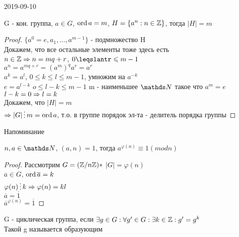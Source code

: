 \documentclass[main]{subfiles}
\begin{document}
	\begin{lect} {2019-09-10}

		\begin{consequence}
		    G - кон. группа, $a \in G$, $\mathop{\rm ord}\nolimits a = m$, $H=\{a^n:n \in \mathbb{Z}\}$, тогда $|H|=m$\\
		\end{consequence}

		\begin{proof}
		    $\{a^0=e,a_1,...,a^{m-1}\}$ - подмножество H\\
		    Докажем, что все остальные элементы тоже здесь есть\\
		    $n \in \mathbb{Z} \Rightarrow n=m q+r$, $0 \leqslantr \leqslant m-1$\\
		    $a^n=a^{m q+r}=(a^m)^q a^r=a^r$\\
		    $a^k=a^l$, $0 \leqslant k \leqslant l \leqslant m-1$, умножим на $a^{-k}$\\
		    $e=a^{l-k}$ $o \leqslant l-k \leqslant m-1$ m - наименьшее $\N$ такое что $a^m=e$\\
		    $l-k=0 \Rightarrow l=k$\\
		    Докажем, что $|H|=m$\\
		    $\Ra |G| \devides m=\ord a$, т.о. в группе порядок эл-та - делитель порядка группы
		\end{proof}

		Напоминание

		\begin{consequence}
		    $n,a \in \N$, $(a,n)=1$, тогда $a^{\varphi(n)} \equiv 1 (mod n)$
		\end{consequence}

		\begin{proof}
		    Рассмотрим $G=(\mathbb{Z} / n \mathbb{Z})*$ $|G|=\varphi(n)$\\
		    $\overline{a} \in G$, $\mathop{\rm ord}\nolimits \overline{a}=k$\\
		    $\varphi(n) \devides k \Ra \varphi(n) = kl$\\
		    $\overline{a}=\overline{1}$\\
		    $\overline{a}^{\varphi(n)}=\overline{1}$
		\end{proof}

	\begin{definition}
	    G - циклическая группа, если $\exists g \in G: \forall g' \in G: \exists k \in \mathbb{Z}: g'=g^k$\\
	    Такой g называется образующим
	\end{definition}


\end{lect}
\end{document}
